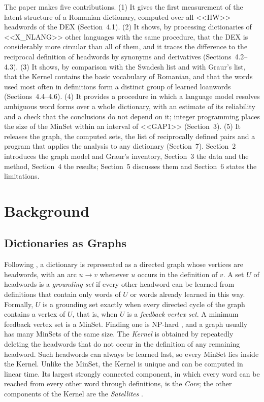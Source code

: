 \documentclass[11pt]{article}
\begin{document}
The paper makes five contributions. (1) It gives the first measurement of the latent structure of a Romanian dictionary, computed over all <<HW>> headwords of the DEX (Section~4.1). (2) It shows, by processing dictionaries of <<X_NLANG>> other languages with the same procedure, that the DEX is considerably more circular than all of them, and it traces the difference to the reciprocal definition of headwords by synonyms and derivatives (Sections~4.2--4.3). (3) It shows, by comparison with the Swadesh list and with Graur's list, that the Kernel contains the basic vocabulary of Romanian, and that the words used most often in definitions form a distinct group of learned loanwords (Sections~4.4--4.6). (4) It provides a procedure in which a language model resolves ambiguous word forms over a whole dictionary, with an estimate of its reliability and a check that the conclusions do not depend on it; integer programming places the size of the MinSet within an interval of <<GAP1>> (Section~3). (5) It releases the graph, the computed sets, the list of reciprocally defined pairs and a program that applies the analysis to any dictionary (Section~7). Section~2 introduces the graph model and Graur's inventory, Section~3 the data and the method, Section~4 the results; Section~5 discusses them and Section~6 states the limitations.

\section{Background}
\subsection{Dictionaries as Graphs}
Following , a dictionary is represented as a directed graph whose vertices are headwords, with an arc $u \rightarrow v$ whenever $u$ occurs in the definition of $v$. A set $U$ of headwords is a \emph{grounding set} if every other headword can be learned from definitions that contain only words of $U$ or words already learned in this way. Formally, $U$ is a grounding set exactly when every directed cycle of the graph contains a vertex of $U$, that is, when $U$ is a \emph{feedback vertex set}. A minimum feedback vertex set is a MinSet. Finding one is NP-hard \cite{karp1972,festa1999}, and a graph usually has many MinSets of the same size. The \emph{Kernel} is obtained by repeatedly deleting the headwords that do not occur in the definition of any remaining headword. Such headwords can always be learned last, so every MinSet lies inside the Kernel. Unlike the MinSet, the Kernel is unique and can be computed in linear time. Its largest strongly connected component, in which every word can be reached from every other word through definitions, is the \emph{Core}; the other components of the Kernel are the \emph{Satellites} \cite{tarjan1972,vincentlamarre2016}.
\end{document}
